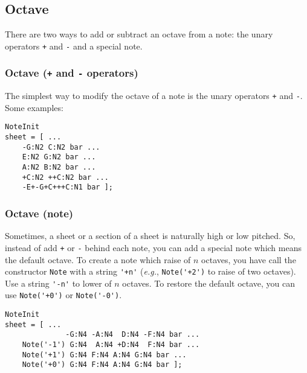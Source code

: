 \documentclass{article}
\begin{document}
\subsection{Octave}

There are two ways to add or subtract an octave from a note: the unary operators \lstinline!+! and \lstinline!-! and a special note.

\subsubsection{Octave (\lstinline!+! and \lstinline!-! operators)}

The simplest way to modify the octave of a note is the unary operators \lstinline!+! and \lstinline!-!. Some examples: \\

\begin{lstlisting}
NoteInit
sheet = [ ...
	-G:N2 C:N2 bar ...
	E:N2 G:N2 bar ...
	A:N2 B:N2 bar ...
	+C:N2 ++C:N2 bar ...
	-E+-G+C+++C:N1 bar ];
\end{lstlisting}

\subsubsection{Octave (note)}

Sometimes, a sheet or a section of a sheet is naturally high or low pitched. So, instead of add \lstinline!+! or \lstinline!-! behind each note, you can add a special note which means the default octave. To create a note which raise of $n$ octaves, you have call the constructor \lstinline!Note! with a string \lstinline!'+n'! (\emph{e.g.}, \lstinline!Note('+2')! to raise of two octaves). Use a string \lstinline!'-n'! to lower of $n$ octaves. To restore the default octave, you can use \lstinline!Note('+0')! or \lstinline!Note('-0')!. \\

\begin{lstlisting}
NoteInit
sheet = [ ...
	          -G:N4 -A:N4  D:N4 -F:N4 bar ...
	Note('-1') G:N4  A:N4 +D:N4  F:N4 bar ...
	Note('+1') G:N4 F:N4 A:N4 G:N4 bar ...
	Note('+0') G:N4 F:N4 A:N4 G:N4 bar ];
\end{lstlisting}
\end{document}
